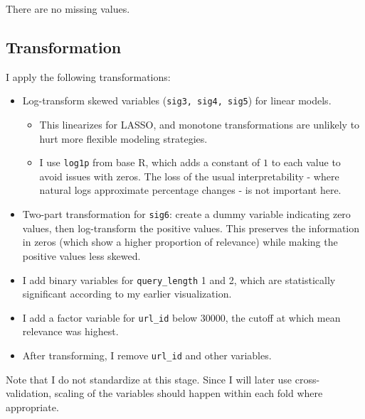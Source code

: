 \documentclass[
]{article}
\providecommand{\tightlist}{%
  \setlength{\itemsep}{0pt}\setlength{\parskip}{0pt}}
\begin{document}
There are no missing values.

\subsection{Transformation}\label{transformation}

I apply the following transformations:

\begin{itemize}
\tightlist
\item
  Log-transform skewed variables (\texttt{sig3,\ sig4,\ sig5}) for
  linear models.

  \begin{itemize}
  \tightlist
  \item
    This linearizes for LASSO, and monotone transformations are unlikely
    to hurt more flexible modeling strategies.
  \item
    I use \texttt{log1p} from base R, which adds a constant of \(1\) to
    each value to avoid issues with zeros. The loss of the usual
    interpretability - where natural logs approximate percentage changes
    - is not important here.
  \end{itemize}
\item
  Two-part transformation for \texttt{sig6}: create a dummy variable
  indicating zero values, then log-transform the positive values. This
  preserves the information in zeros (which show a higher proportion of
  relevance) while making the positive values less skewed.
\item
  I add binary variables for \texttt{query\_length} 1 and 2, which are
  statistically significant according to my earlier visualization.
\item
  I add a factor variable for \texttt{url\_id} below \(30000\), the
  cutoff at which mean relevance was highest.
\item
  After transforming, I remove \texttt{url\_id} and other variables.
\end{itemize}

Note that I do not standardize at this stage. Since I will later use
cross-validation, scaling of the variables should happen within each
fold where appropriate.
\end{document}
